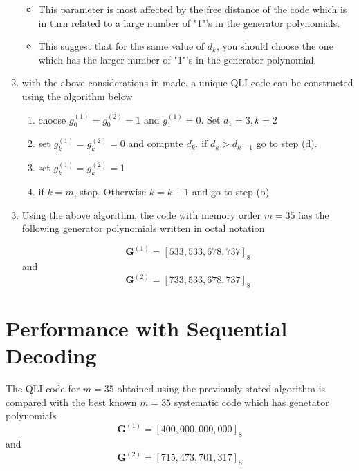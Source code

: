 \documentclass[fontsize=12pt]{article}
\begin{document}
\begin{enumerate}
\begin{itemize}
\item This parameter is most affected by the free distance of the code which is in turn related to a large number of "1"'s in the generator polynomials.

\item This suggest that for the same value of $d_k$, you should choose the one which has the larger number of "1"'s in the generator polynomial.

\end{itemize}
\item with the above considerations in made, a unique QLI code can be constructed using the algorithm below

\begin{enumerate}
\item choose $g_0^{(1)} = g_0^{(2)}  =1$ and  $g_1^{(1)} =0$. Set $d_1=3,k=2$ 

\item set $g_k^{(1)} = g_k^{(2)}=0$ and compute $d_k$. if $d_k > d_{k-1}$ go to step (d).

\item set $g_k^{(1)} = g_k^{(2)}=1$ 

\item if $k=m$, stop. Otherwise $k=k+1$ and go to step (b)
\end{enumerate}

\item Using the above algorithm, the code with memory order $m=35$ has the following generator polynomials written in octal notation 

$$ \mathbf{G}^{(1)}=[533,533,678,737]_8$$ and $$ \mathbf{G}^{(2)}=[733,533,678,737]_8$$
\end{enumerate}

\section{Performance with Sequential Decoding}
The QLI code for $m=35$ obtained using the previously stated algorithm is compared with the best known $m=35$ systematic code which has genetator polynomials $$ \mathbf{G}^{(1)}=[400,000,000,000]_8$$ and $$ \mathbf{G}^{(2)}=[715,473,701,317]_8$$
\end{document}
